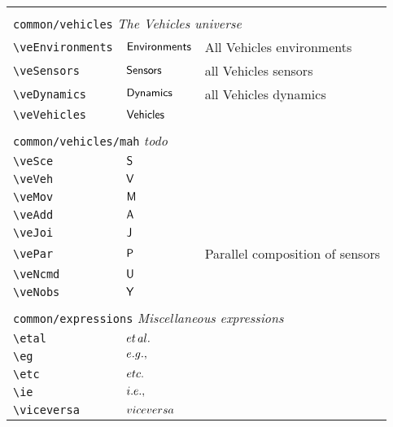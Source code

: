 \begin{longtable}{lll}
  &  & \\ 
 \multicolumn{3}{l}{{\color[rgb]{0.5,0.5,0.5}\texttt{common/vehicles}} \emph{The Vehicles universe}}\\ 
 \hline
{\color[rgb]{0.5,0.5,0.5}\texttt{\textbackslash veEnvironments}} & $\mathsf{Environments}$ &  All Vehicles environments \\ 
 {\color[rgb]{0.5,0.5,0.5}\texttt{\textbackslash veSensors}} & $\mathsf{Sensors}$ &  all Vehicles sensors\\ 
 {\color[rgb]{0.5,0.5,0.5}\texttt{\textbackslash veDynamics}} & $\mathsf{Dynamics}$ &  all Vehicles dynamics\\ 
 {\color[rgb]{0.5,0.5,0.5}\texttt{\textbackslash veVehicles}} & $\mathsf{Vehicles}$ & \\ 
  &  & \\ 
 \multicolumn{3}{l}{{\color[rgb]{0.5,0.5,0.5}\texttt{common/vehicles/mah}} \emph{todo}}\\ 
 \hline
{\color[rgb]{0.5,0.5,0.5}\texttt{\textbackslash veSce}} & $\mathsf{S}$ & \\ 
 {\color[rgb]{0.5,0.5,0.5}\texttt{\textbackslash veVeh}} & $\mathsf{V}$ & \\ 
 {\color[rgb]{0.5,0.5,0.5}\texttt{\textbackslash veMov}} & $\mathsf{M}$ & \\ 
 {\color[rgb]{0.5,0.5,0.5}\texttt{\textbackslash veAdd}} & $\mathsf{A}$ & \\ 
 {\color[rgb]{0.5,0.5,0.5}\texttt{\textbackslash veJoi}} & $\mathsf{J}$ & \\ 
 {\color[rgb]{0.5,0.5,0.5}\texttt{\textbackslash vePar}} & $\mathsf{P}$ &  Parallel composition of sensors\\ 
 {\color[rgb]{0.5,0.5,0.5}\texttt{\textbackslash veNcmd}} & $\mathsf{U}$ & \\ 
 {\color[rgb]{0.5,0.5,0.5}\texttt{\textbackslash veNobs}} & $\mathsf{Y}$ & \\ 
  &  & \\ 
 \multicolumn{3}{l}{{\color[rgb]{0.5,0.5,0.5}\texttt{common/expressions}} \emph{Miscellaneous expressions}}\\ 
 \hline
{\color[rgb]{0.5,0.5,0.5}\texttt{\textbackslash etal}} & ${et\,al.}$ & \\ 
 {\color[rgb]{0.5,0.5,0.5}\texttt{\textbackslash eg}} & ${e.g.},$ & \\ 
 {\color[rgb]{0.5,0.5,0.5}\texttt{\textbackslash etc}} & ${etc.}$ & \\ 
 {\color[rgb]{0.5,0.5,0.5}\texttt{\textbackslash ie}} & ${i.e.},$ & \\ 
 {\color[rgb]{0.5,0.5,0.5}\texttt{\textbackslash viceversa}} & ${vice versa}$ & \\ 

\end{longtable}
